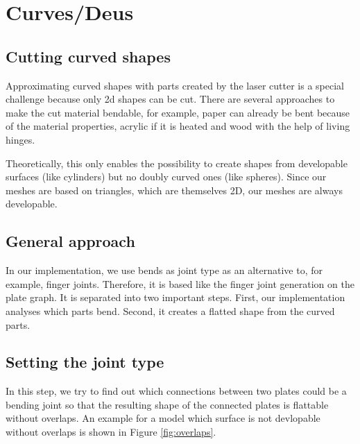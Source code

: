 \documentclass[../ClassicThesis.tex]{subfiles}
\begin{document}
\chapter{Curves/Deus}\label{ch:curves}

\section{Cutting curved shapes}

Approximating curved shapes with parts created by the laser cutter is a special challenge because only 2d shapes can be cut. There are several approaches to make the cut material bendable, for example, paper can already be bent because of the material properties, acrylic if it is heated and wood with the help of living hinges.

Theoretically, this only enables the possibility to create shapes from developable surfaces (like cylinders) but no doubly curved ones (like spheres). Since our meshes are based on triangles, which are themselves 2D, our meshes are always developable.

\section{General approach}

In our implementation, we use bends as joint type as an alternative to, for example, finger joints. Therefore, it is based like the finger joint generation on the plate graph. It is separated into two important steps. First, our implementation analyses which parts bend. Second, it creates a flatted shape from the curved parts.

\section{Setting the joint type}

In this step, we try to find out which connections between two plates could be a bending joint so that the resulting shape of the connected plates is flattable without overlaps. An example for a model which surface is not devlopable without overlaps is shown in Figure \ref{fig:overlaps}.
\end{document}
